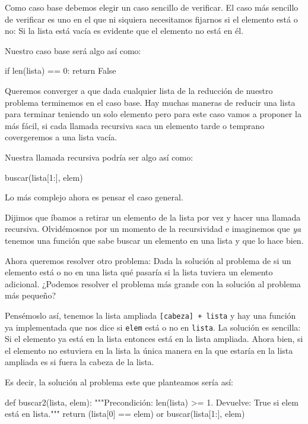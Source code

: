 Como caso base debemos elegir un caso sencillo de verificar. El caso más
sencillo de verificar es uno en el que ni siquiera necesitamos fijarnos si el
elemento está o no: Si la lista está vacía es evidente que el elemento no está en él.

Nuestro caso base será algo así como:
\begin{codigo-python-sn}
    if len(lista) == 0:
        return False
\end{codigo-python-sn}

Queremos converger a que dada cualquier lista de la reducción de nuestro
problema terminemos en el caso base. Hay muchas maneras de reducir una lista
para terminar teniendo un solo elemento pero para este caso vamos a proponer la
más fácil, si cada llamada recursiva saca un elemento tarde o temprano
covergeremos a una lista vacía.

Nuestra llamada recursiva podría ser algo así como:
\begin{codigo-python-sn}
   buscar(lista[1:], elem)
\end{codigo-python-sn}

Lo más complejo ahora es pensar el caso general.

Dijimos que íbamos a retirar
un elemento de la lista por vez y hacer una llamada recursiva. Olvidémosnos por
un momento de la recursividad e imaginemos que \emph{ya} tenemos una función
que sabe buscar un elemento en una lista y que lo hace bien.

Ahora queremos resolver otro problema: Dada la solución al problema de si un
elemento está o no en una lista qué pasaría si la lista tuviera un elemento
adicional. ¿Podemos resolver el problema más grande con la solución al problema
más pequeño?

Pensémoslo así, tenemos la lista ampliada \lstinline![cabeza] + lista! y hay una función
ya implementada que nos dice si \lstinline!elem! está o no en \lstinline!lista!.
La solución es sencilla: Si el elemento ya está en la lista entonces está en la
lista ampliada. Ahora bien, si el elemento no estuviera en la lista la única
manera en la que estaría en la lista ampliada es si fuera la cabeza de la lista.

Es decir, la solución al problema este que planteamos sería así:
\begin{codigo-python-sn}
def buscar2(lista, elem):
   """Precondición: len(lista) >= 1.
      Devuelve: True si elem está en lista."""
   return (lista[0] == elem) or buscar(lista[1:], elem)
\end{codigo-python-sn}

